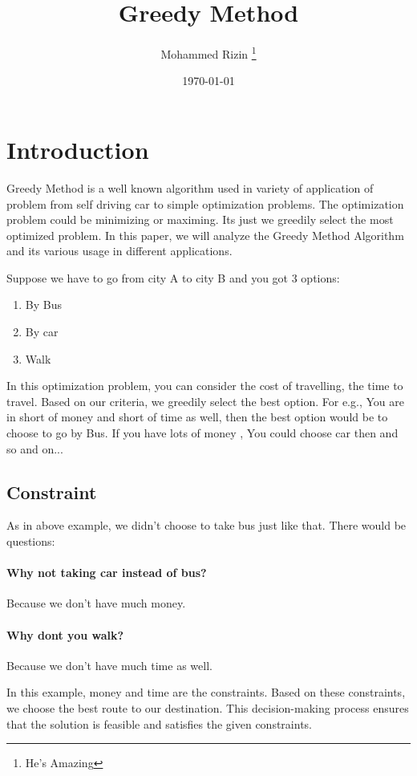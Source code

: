 \documentclass[11pt, a4paper]{article}
\title{Greedy Method}
\author[1] {Mohammed Rizin \footnote{He's Amazing}}
\affiliation[1]{Umemployed, Navi Mumbai, Maharashtra}
\date{\today}
\begin{document}
\maketitle
\section{Introduction}
Greedy Method is a well known algorithm used in variety of application of problem from self driving car to simple optimization problems. The optimization problem could be minimizing or maximing. Its just we greedily select the most optimized problem.
In this paper, we will analyze the Greedy Method Algorithm and its various usage in different applications.

Suppose we have to go from city A to city B and you got 3 options:
    \begin{enumerate}
        \item By Bus
        \item By car
        \item Walk
    \end{enumerate}

In this optimization problem, you can consider the cost of travelling, the time to travel. Based on our criteria, we greedily select the best option. For e.g., You are in short of money and short of time as well, then the best option would be to choose to go by Bus. If you have lots of money , You could choose car then and so and on...

\subsection{Constraint}
As in above example, we didn't choose to take bus just like that. There would be questions:
\paragraph{Why not taking car instead of bus?}
Because we don't have much money. 
\paragraph{Why dont you walk?}
Because we don't have much time as well. 

In this example, money and time are the constraints. Based on these constraints, we choose the best route to our destination. This decision-making process ensures that the solution is feasible and satisfies the given constraints.
\end{document}
